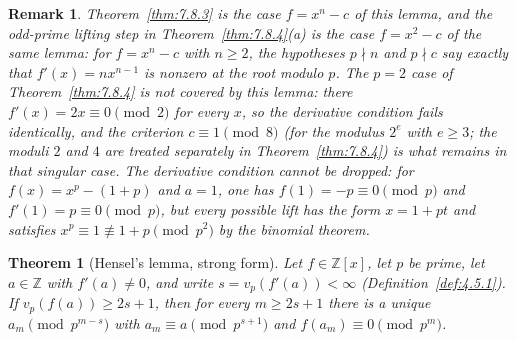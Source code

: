 \documentclass[11pt]{article}
\theoremstyle{ntstyle}
\newtheorem{theorem}{Theorem}[subsection]
\newtheorem*{remark}{Remark}
\begin{document}
\begin{remark}
  Theorem~\ref{thm:7.8.3} is the case $f=x^n-c$ of this lemma, and the
  odd-prime lifting step in Theorem~\ref{thm:7.8.4}(a) is the case $f=x^2-c$ of the same lemma:
  for $f=x^n-c$ with $n\ge2$, the hypotheses $p\nmid n$ and
  $p\nmid c$ say exactly that $f'(x) = n x^{n-1}$ is nonzero at the root
  modulo $p$. The $p = 2$ case of Theorem~\ref{thm:7.8.4} is not covered by this
  lemma: there $f'(x) = 2x \equiv 0 \pmod{2}$ for every $x$, so the derivative
  condition fails identically, and the criterion $c\equiv1\pmod{8}$ (for the modulus $2^e$ with $e\ge3$; the moduli
  $2$ and $4$ are treated separately in Theorem~\ref{thm:7.8.4}) is what
  remains in that singular case. The derivative condition cannot be
  dropped: for $f(x)=x^p-(1+p)$ and $a=1$, one has
  $f(1)=-p\equiv0\pmod{p}$ and $f'(1)=p\equiv0\pmod{p}$, but every possible
  lift has the form $x=1+pt$ and satisfies $x^p\equiv1\not\equiv1+p\pmod{p^2}$ by
  the binomial theorem.

\end{remark}

\begin{theorem}[Hensel's lemma, strong form]\label{thm:11.4.2}\label{thm:hensel-lemma-strong-form}
  Let $f\in\mathbb{Z}[x]$, let $p$
  be prime, let $a\in\mathbb{Z}$ with $f'(a)\neq0$, and write
  $s = v_p(f'(a))<\infty$ (Definition~\ref{def:4.5.1}). If $v_p(f(a))\ge2s + 1$, then for every $m\ge2s + 1$
  there is a unique $a_m\pmod{p^{m-s}}$ with $a_m\equiv a\pmod{p^{s+1}}$
  and $f(a_m)\equiv0\pmod{p^{m}}$.

\end{theorem}
\end{document}
